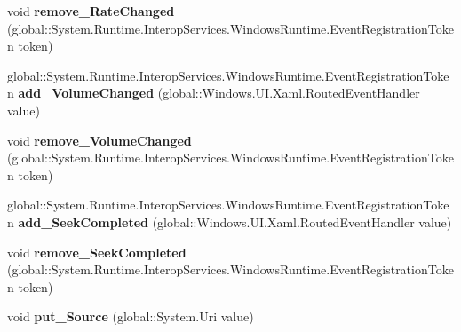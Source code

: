 \begin{DoxyCompactItemize}
void {\bfseries remove\+\_\+\+Rate\+Changed} (global\+::\+System.\+Runtime.\+Interop\+Services.\+Windows\+Runtime.\+Event\+Registration\+Token token)
\item 
\mbox{\label{interface_windows_1_1_u_i_1_1_xaml_1_1_controls_1_1_i_media_element_aedd52f355cd6b0ac289dab97618b03b2}} 
global\+::\+System.\+Runtime.\+Interop\+Services.\+Windows\+Runtime.\+Event\+Registration\+Token {\bfseries add\+\_\+\+Volume\+Changed} (global\+::\+Windows.\+U\+I.\+Xaml.\+Routed\+Event\+Handler value)
\item 
\mbox{\label{interface_windows_1_1_u_i_1_1_xaml_1_1_controls_1_1_i_media_element_a60f936214a2f097646cfe13f567cf130}} 
void {\bfseries remove\+\_\+\+Volume\+Changed} (global\+::\+System.\+Runtime.\+Interop\+Services.\+Windows\+Runtime.\+Event\+Registration\+Token token)
\item 
\mbox{\label{interface_windows_1_1_u_i_1_1_xaml_1_1_controls_1_1_i_media_element_a64d29cca7343776b34eef183fe2f0a47}} 
global\+::\+System.\+Runtime.\+Interop\+Services.\+Windows\+Runtime.\+Event\+Registration\+Token {\bfseries add\+\_\+\+Seek\+Completed} (global\+::\+Windows.\+U\+I.\+Xaml.\+Routed\+Event\+Handler value)
\item 
\mbox{\label{interface_windows_1_1_u_i_1_1_xaml_1_1_controls_1_1_i_media_element_adb3cb1c1f4bff532d4654363a56adcf1}} 
void {\bfseries remove\+\_\+\+Seek\+Completed} (global\+::\+System.\+Runtime.\+Interop\+Services.\+Windows\+Runtime.\+Event\+Registration\+Token token)
\item 
\mbox{\label{interface_windows_1_1_u_i_1_1_xaml_1_1_controls_1_1_i_media_element_a9ccfe5f23b86ca54424f89ee8816be21}} 
void {\bfseries put\+\_\+\+Source} (global\+::\+System.\+Uri value)
\item 
\mbox{\label{interface_windows_1_1_u_i_1_1_xaml_1_1_controls_1_1_i_media_element_a499a56726198bd3a2e13da7fdaea8eb4}} 

\end{DoxyCompactItemize}
